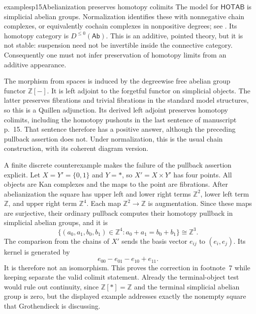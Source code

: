 \begin{dcomment}{examples}{p15}{Abelianization preserves homotopy colimits}
The model for $\mathsf{HOTAB}$ is simplicial abelian groups. Normalization identifies these with nonnegative chain complexes, or equivalently cochain complexes in nonpositive degrees; see \citet[Theorem~14.24.3, Tag~019D]{StacksDoldKan}. Its homotopy category is $D^{\leq0}(\mathsf{Ab})$. This is an additive, pointed theory, but it is not stable: suspension need not be invertible inside the connective category. Consequently one must not infer preservation of homotopy limits from an additive appearance.

The morphism from spaces is induced by the degreewise free abelian group functor $\mathbb Z[-]$. It is left adjoint to the forgetful functor on simplicial objects. The latter preserves fibrations and trivial fibrations in the standard model structures, so this is a Quillen adjunction. Its derived left adjoint preserves homotopy colimits, including the homotopy pushouts in the last sentence of manuscript p.~15. That sentence therefore has a positive answer, although the preceding pullback assertion does not. Under normalization, this is the usual chain construction, with its coherent diagram version.

A finite discrete counterexample makes the failure of the pullback assertion explicit. Let $X=Y'=\{0,1\}$ and $Y=*$, so $X'=X\times Y'$ has four points. All objects are Kan complexes and the maps to the point are fibrations. After abelianization the square has upper left and lower right terms $\mathbb Z^2$, lower left term $\mathbb Z$, and upper right term $\mathbb Z^4$. Each map $\mathbb Z^2\to\mathbb Z$ is augmentation. Since these maps are surjective, their ordinary pullback computes their homotopy pullback in simplicial abelian groups, and it is
\[
 \{(a_0,a_1,b_0,b_1)\in\mathbb Z^4:
 a_0+a_1=b_0+b_1\}\cong\mathbb Z^3.
\]
The comparison from the chains of $X'$ sends the basis vector $e_{ij}$ to $(e_i,e_j)$. Its kernel is generated by
\[
 e_{00}-e_{01}-e_{10}+e_{11}.
\]
It is therefore not an isomorphism. This proves the correction in footnote~7 while keeping separate the valid colimit statement. Already the terminal-object test would rule out continuity, since $\mathbb Z[*]=\mathbb Z$ and the terminal simplicial abelian group is zero, but the displayed example addresses exactly the nonempty square that Grothendieck is discussing.
\end{dcomment}


